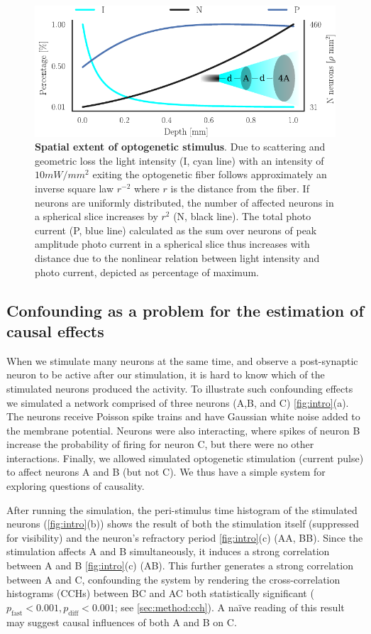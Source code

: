 \documentclass[11pt]{article}
\begin{document}
\begin{figure}\includegraphics[scale=.95]{opto-powerlaw}
\caption{{\bf Spatial extent of optogenetic stimulus}. 
Due to scattering and geometric loss the light intensity (I, cyan line) with an intensity of $10 mW/mm^2$ exiting the optogenetic fiber follows approximately an inverse square law $ r^{-2} $ where $ r $ is the distance from the fiber. 
If neurons are uniformly distributed, the number of affected neurons in a spherical slice increases by $ r^{2} $ (N, black line). 
The total photo current (P, blue line) calculated as the sum over neurons of peak amplitude photo current in a spherical slice thus increases with distance due to the nonlinear relation between light intensity and photo current, depicted as percentage of maximum.}
\label{fig:concept}
\end{figure}

\FloatBarrier
\subsection{Confounding as a problem for the estimation of causal effects}
When we stimulate many neurons at the same time, and observe a post-synaptic neuron to be active after our stimulation, it is hard to know which of the stimulated neurons produced the activity. 
To illustrate such confounding effects we simulated a network comprised of three neurons (A,B, and C) \cref{fig:intro}(a). 
The neurons receive Poisson spike trains and have Gaussian white noise added to the membrane potential. 
Neurons were also interacting, where spikes of neuron B increase the probability of firing for neuron C, but there were no other interactions.
Finally, we allowed simulated optogenetic stimulation (current pulse) to affect neurons A and B (but not C). 
We thus have a simple system for exploring questions of causality.

After running the simulation, the peri-stimulus time histogram of the stimulated neurons (\cref{fig:intro}(b)) shows the result of both the stimulation itself (suppressed for visibility) and the neuron's refractory period \cref{fig:intro}(c) (AA, BB).
Since the stimulation affects A and B simultaneously, it induces a strong correlation between A and B \cref{fig:intro}(c) (AB). 
This further generates a strong correlation between A and C, confounding the system by rendering the cross-correlation histograms (CCHs) between BC and AC both statistically significant ($ p_{\mathrm{fast}} < 0.001, p_{\mathrm{diff}} < 0.001 $; see \cref{sec:method:cch}). 
A na\"ive reading of this result may suggest causal influences of both A and B on C.
\end{document}
